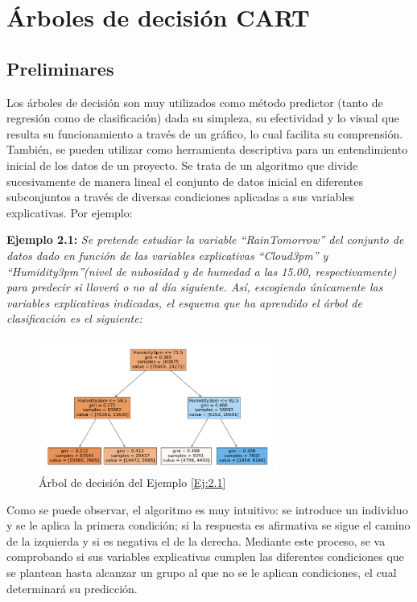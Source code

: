 \documentclass[12pt,twoside]{article}
\begin{document}
\newpage



\section{Árboles de decisión CART}
\subsection{Preliminares}

Los árboles de decisión son muy utilizados como método predictor (tanto de regresión como de clasificación) dada su simpleza, su efectividad y lo visual que resulta su funcionamiento a través de un gráfico, lo cual facilita su comprensión. También, se pueden utilizar como herramienta descriptiva para un entendimiento inicial de los datos de un proyecto. Se trata de un algoritmo que divide sucesivamente de manera lineal el conjunto de datos inicial en diferentes subconjuntos a través de diversas condiciones aplicadas a sus variables explicativas. Por ejemplo:

\textbf{Ejemplo 2.1: } \label{Ej:2.1} \emph{Se pretende estudiar la variable ``RainTomorrow'' del conjunto de datos dado en función de las variables explicativas ``Cloud3pm'' y ``Humidity3pm''(nivel de nubosidad y de humedad a las 15.00, respectivamente) para predecir si lloverá o no al día siguiente. Así, escogiendo únicamente las variables explicativas indicadas, el esquema que ha aprendido el árbol de clasificación es el siguiente: }
\begin{figure}[h]
	\centering
	\includegraphics[width = 0.7\textwidth]{ex2_1_01}
	\caption{Árbol de decisión del Ejemplo \ref{Ej:2.1}}
	\label{fig:Ejemplo 2.1}
\end{figure}

Como se puede observar, el algoritmo es muy intuitivo: se introduce un individuo y se le aplica la primera condición; si la respuesta es afirmativa se sigue el camino de la izquierda y si es negativa el de la derecha. Mediante este proceso, se va comprobando si sus variables explicativas cumplen las diferentes condiciones que se plantean hasta alcanzar un grupo al que no se le aplican condiciones, el cual determinará su predicción.
\end{document}
